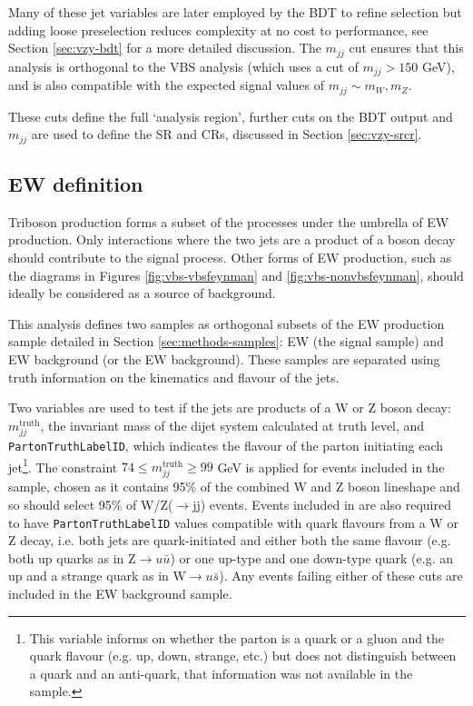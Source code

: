 Many of these jet variables are later employed by the \ac{BDT} to refine
selection but adding loose preselection reduces complexity at no cost to
performance, see Section \ref{sec:vzy-bdt} for a more detailed discussion.
The $m_{jj}$ cut ensures that this analysis is orthogonal to the \ac{VBS} \Zy
analysis (which uses a cut of $m_{jj} > 150$ GeV), and is also compatible with
the expected signal values of $m_{jj} \sim m_W,m_Z$.

These cuts define the full `analysis region', further cuts on the \ac{BDT} output
and $m_{jj}$ are used to define the \ac{SR} and \acp{CR}, discussed in Section
\ref{sec:vzy-srcr}.


\subsection{\acs{EW} \VZy definition}
\label{sec:vzy-selection-vzy}

Triboson \VZy production forms a subset of the processes under the umbrella of
\ac{EW} \Zyjj production. Only interactions where the two jets are a product of
a boson decay should contribute to the signal process. Other forms of \ac{EW}
\Zyjj production, such as the diagrams in Figures \ref{fig:vbs-vbsfeynman} and
\ref{fig:vbs-nonvbsfeynman}, should ideally be considered as a source of
background.

\newcommand\mjjtruth{\ensuremath{m_{jj}^\text{truth}}\xspace}
\newcommand\partonid{\texttt{PartonTruthLabelID}\xspace}
This analysis defines two samples as orthogonal subsets of the \ac{EW} \Zyjj
production sample detailed in Section \ref{sec:methods-samples}: \ac{EW} \VZy
(the signal sample) and \ac{EW} \Zyjj background (or the \ac{EW}
background). These samples are separated using truth information on the
kinematics and flavour of the jets.

Two variables are used to test if the jets are products of a W or Z boson decay:
\mjjtruth, the invariant mass of the dijet system calculated at truth level, and
\partonid, which indicates the flavour of the parton initiating each
jet\footnote{
  This variable informs on whether the parton is a quark or a gluon and the
  quark flavour (e.g. up, down, strange, etc.) but does not distinguish between
  a quark and an anti-quark, that information was not available in the sample.
}.
The constraint $74 \leq \mjjtruth \geq 99$ GeV is applied for events included in
the \VZy sample, chosen as it contains 95\% of the combined W and Z boson
lineshape and so should select 95\% of W/Z($\to$jj) events. Events included in
\VZy are also required to have {\partonid} values compatible with quark flavours
from a W or Z decay, i.e. both jets are quark-initiated and either both the same
flavour (e.g. both up quarks as in Z$\to u\bar{u}$) or one up-type and one
down-type quark (e.g. an up and a strange quark as in W$\to u\bar{s}$). Any
events failing either of these cuts are included in the \ac{EW} background
sample.

